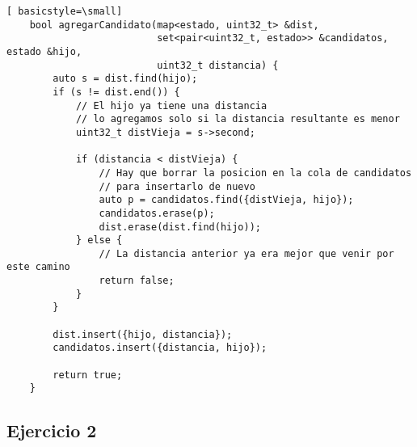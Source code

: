 \begin{lstlisting}[ basicstyle=\small]
    bool agregarCandidato(map<estado, uint32_t> &dist,
                          set<pair<uint32_t, estado>> &candidatos, estado &hijo,
                          uint32_t distancia) {
        auto s = dist.find(hijo);
        if (s != dist.end()) {
            // El hijo ya tiene una distancia
            // lo agregamos solo si la distancia resultante es menor
            uint32_t distVieja = s->second;

            if (distancia < distVieja) {
                // Hay que borrar la posicion en la cola de candidatos
                // para insertarlo de nuevo
                auto p = candidatos.find({distVieja, hijo});
                candidatos.erase(p);
                dist.erase(dist.find(hijo));
            } else {
                // La distancia anterior ya era mejor que venir por este camino
                return false;
            }
        }

        dist.insert({hijo, distancia});
        candidatos.insert({distancia, hijo});

        return true;
    }
\end{lstlisting}

\newpage
\subsection{Ejercicio 2}

